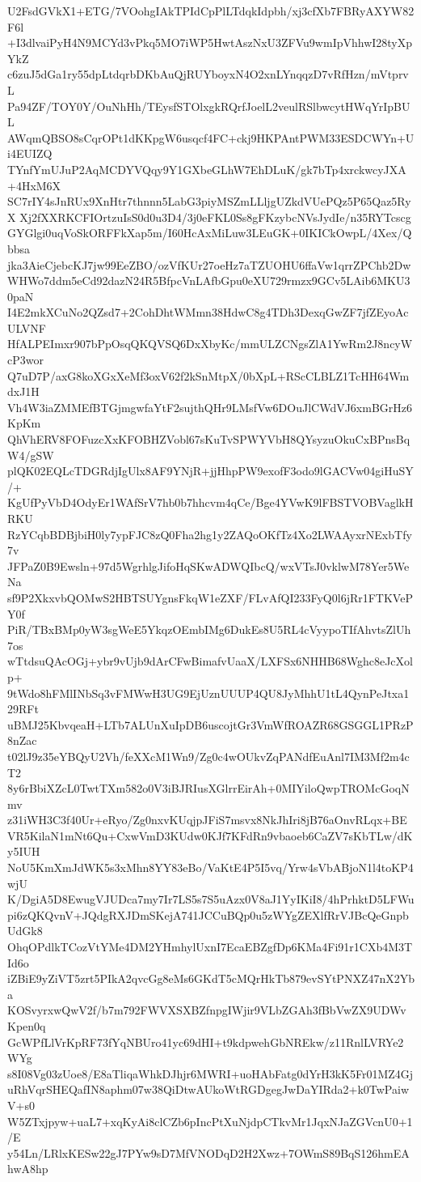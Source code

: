 U2FsdGVkX1+ETG/7VOohgIAkTPIdCpPlLTdqkIdpbh/xj3cfXb7FBRyAXYW82F6l
+I3dlvaiPyH4N9MCYd3vPkq5MO7iWP5HwtAszNxU3ZFVu9wmIpVhhwI28tyXpYkZ
c6zuJ5dGa1ry55dpLtdqrbDKbAuQjRUYboyxN4O2xnLYnqqzD7vRfHzn/mVtprvL
Pa94ZF/TOY0Y/OuNhHh/TEysfSTOlxgkRQrfJoelL2veulRSlbwcytHWqYrIpBUL
AWqmQBSO8sCqrOPt1dKKpgW6usqcf4FC+ckj9HKPAntPWM33ESDCWYn+Ui4EUIZQ
TYnfYmUJuP2AqMCDYVQqy9Y1GXbeGLhW7EhDLuK/gk7bTp4xrckwcyJXA+4HxM6X
SC7rIY4sJnRUx9XnHtr7thnnn5LabG3piyMSZmLLljgUZkdVUePQz5P65Qaz5RyX
Xj2fXXRKCFIOrtzuIsS0d0u3D4/3j0eFKL0Ss8gFKzybcNVsJydIe/n35RYTcscg
GYGlgi0uqVoSkORFFkXap5m/I60HcAxMiLuw3LEuGK+0IKICkOwpL/4Xex/Qbbsa
jka3AieCjebcKJ7jw99EeZBO/ozVfKUr27oeHz7aTZUOHU6ffaVw1qrrZPChb2Dw
WHWo7ddm5eCd92dazN24R5BfpcVnLAfbGpu0eXU729rmzx9GCv5LAib6MKU30paN
I4E2mkXCuNo2QZsd7+2CohDhtWMmn38HdwC8g4TDh3DexqGwZF7jfZEyoAcULVNF
HfALPEImxr907bPpOsqQKQVSQ6DxXbyKc/mmULZCNgsZlA1YwRm2J8ncyWcP3wor
Q7uD7P/axG8koXGxXeMf3oxV62f2kSnMtpX/0bXpL+RScCLBLZ1TcHH64WmdxJ1H
Vh4W3iaZMMEfBTGjmgwfaYtF2sujthQHr9LMsfVw6DOuJlCWdVJ6xmBGrHz6KpKm
QhVhERV8FOFuzcXxKFOBHZVobl67sKuTvSPWYVbH8QYsyzuOkuCxBPnsBqW4/gSW
plQK02EQLcTDGRdjIgUlx8AF9YNjR+jjHhpPW9exofF3odo9lGACVw04giHuSY/+
KgUfPyVbD4OdyEr1WAfSrV7hb0b7hhcvm4qCe/Bge4YVwK9lFBSTVOBVaglkHRKU
RzYCqbBDBjbiH0ly7ypFJC8zQ0Fha2hg1y2ZAQoOKfTz4Xo2LWAAyxrNExbTfy7v
JFPaZ0B9Ewsln+97d5WgrhlgJifoHqSKwADWQIbcQ/wxVTsJ0vklwM78Yer5WeNa
sf9P2XkxvbQOMwS2HBTSUYgnsFkqW1eZXF/FLvAfQI233FyQ0l6jRr1FTKVePY0f
PiR/TBxBMp0yW3sgWeE5YkqzOEmbIMg6DukEs8U5RL4cVyypoTIfAhvtsZlUh7os
wTtdsuQAcOGj+ybr9vUjb9dArCFwBimafvUaaX/LXFSx6NHHB68Wghc8eJcXolp+
9tWdo8hFMlINbSq3vFMWwH3UG9EjUznUUUP4QU8JyMhhU1tL4QynPeJtxa129RFt
uBMJ25KbvqeaH+LTb7ALUnXuIpDB6uscojtGr3VmWfROAZR68GSGGL1PRzP8nZac
t02lJ9z35eYBQyU2Vh/feXXcM1Wn9/Zg0c4wOUkvZqPANdfEuAnl7IM3Mf2m4cT2
8y6rBbiXZcL0TwtTXm582o0V3iBJRIusXGlrrEirAh+0MIYiloQwpTROMcGoqNmv
z31iWH3C3f40Ur+eRyo/Zg0nxvKUqjpJFiS7msvx8NkJhIri8jB76aOnvRLqx+BE
VR5KilaN1mNt6Qu+CxwVmD3KUdw0KJf7KFdRn9vbaoeb6CaZV7sKbTLw/dKy5IUH
NoU5KmXmJdWK5s3xMhn8YY83eBo/VaKtE4P5I5vq/Yrw4sVbABjoN1l4toKP4wjU
K/DgiA5D8EwugVJUDca7my7Ir7LS5s7S5uAzx0V8aJ1YyIKiI8/4hPrhktD5LFWu
pi6zQKQvnV+JQdgRXJDmSKejA741JCCuBQp0u5zWYgZEXlfRrVJBcQeGnpbUdGk8
OhqOPdlkTCozVtYMe4DM2YHmhylUxnI7EcaEBZgfDp6KMa4Fi91r1CXb4M3TId6o
iZBiE9yZiVT5zrt5PIkA2qvcGg8eMs6GKdT5cMQrHkTb879evSYtPNXZ47nX2Yba
KOSvyrxwQwV2f/b7m792FWVXSXBZfnpgIWjir9VLbZGAh3fBbVwZX9UDWvKpen0q
GcWPfLlVrKpRF73fYqNBUro41yc69dHI+t9kdpwehGbNREkw/z11RnlLVRYe2WYg
s8I08Vg03zUoe8/E8aTliqaWhkDJhjr6MWRI+uoHAbFatg0dYrH3kK5Fr01MZ4Gj
uRhVqrSHEQafIN8aphm07w38QiDtwAUkoWtRGDgegJwDaYIRda2+k0TwPaiwV+s0
W5ZTxjpyw+uaL7+xqKyAi8clCZb6pIncPtXuNjdpCTkvMr1JqxNJaZGVcnU0+1/E
y54Ln/LRlxKESw22gJ7PYw9sD7MfVNODqD2H2Xwz+7OWmS89BqS126hmEAhwA8hp
